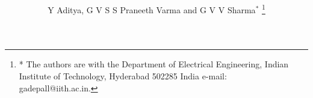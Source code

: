 \documentclass[journal,12pt,twocolumn]{IEEEtran}
\begin{document}
\let\StandardTheFigure\thefigure
\let\StandardTheTable\thetable
\let\vec\mathbf

\renewcommand{\thefigure}{\theproblem}
\renewcommand{\thetable}{\theproblem}


\def\putbox#1#2#3{\makebox[0in][l]{\makebox[#1][l]{}\raisebox{\baselineskip}[0in][0in]{\raisebox{#2}[0in][0in]{#3}}}}
     \def\rightbox#1{\makebox[0in][r]{#1}}
     \def\centbox#1{\makebox[0in]{#1}}
     \def\topbox#1{\raisebox{-\baselineskip}[0in][0in]{#1}}
     \def\midbox#1{\raisebox{-0.5\baselineskip}[0in][0in]{#1}}

\vspace{3cm}


\title{%
}


%
%
%

\author{Y Aditya, G V S S Praneeth Varma and G V V Sharma$^{*}$%
\thanks{* The authors are with the Department
of Electrical Engineering, Indian Institute of Technology, Hyderabad
502285 India e-mail:  gadepall@iith.ac.in.}%
}
% 
%
\end{document}
